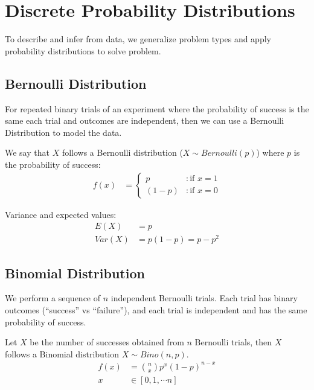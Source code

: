         \chapter{Discrete Probability Distributions} %
        \label{cha:discrete_probability_distributions}
            To describe and infer from data, we generalize problem types and apply probability distributions to solve problem.

            \section{Bernoulli Distribution} %
            \label{sec:bernoulli_distribution}
                For repeated binary trials of an experiment where the probability of success is the same each trial and outcomes are independent, then we can use a Bernoulli Distribution to model the data.

                We say that $X$ follows a Bernoulli distribution ($X \sim Bernoulli(p)$) where $p$ is the probability of success:
                \begin{align*}
                   f(x) &= \left\{
                     \begin{array}{lr}
                       p & : \text{if } x = 1 \\
                       (1-p) & : \text{if } x = 0
                     \end{array}
                   \right.
                \end{align*}

                Variance and expected values:
                \begin{align*}
                      E(X) &= p \\
                      Var(X) &= p (1 - p) = p - p^2
                 \end{align*}
            \section{Binomial Distribution} %
            \label{sec:binomial_distribution}
                We perform a sequence of $n$ independent Bernoulli trials.
                Each trial has binary outcomes (``success'' vs ``failure''), and each trial is independent and has the same probability of success.

                Let $X$ be the number of successes obtained from $n$ Bernoulli trials, then $X$ follows a Binomial distribution $X \sim Bino(n, p)$.
                \begin{align*}
                    f(x) &= {n \choose x} p^x (1-p)^{n-x} \\
                    x &\in [0, 1, \cdots n]
                \end{align*}

